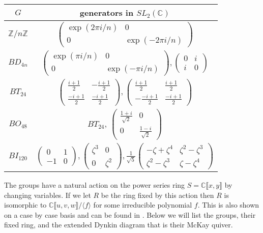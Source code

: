 \documentclass[11pt, a4paper, english]{article}
\theoremstyle{definition}
\newcommand{\C}{\mathbb{C}}
\begin{document}
\begin{center}
{\renewcommand{\arraystretch}{2}
\begin{tabular}{|c|c|}
\hline
$G$ & generators in $SL_2(\C)$
\\
\hline
\hline
$\mathbb{Z}/n\mathbb{Z}$ & $\begin{pmatrix}
\exp(2\pi i/n) & 0\\
0 & \exp(-2\pi i/n)
\end{pmatrix} $\\
\hline
$BD_{4n}$ &  $ \begin{pmatrix}
\exp(\pi i/n) & 0\\
0 & \exp(-\pi i/n)
\end{pmatrix}, \begin{pmatrix}
0 & i\\
i & 0
\end{pmatrix} $\\
\hline
$BT_{24}$ & $ \begin{pmatrix}
\frac{i+1}{2} & -\frac{i+1}{2}\\
\frac{-i+1}{2} & \frac{-i+1}{2}
\end{pmatrix}, \begin{pmatrix}
\frac{i+1}{2} & \frac{i+1}{2}\\
-\frac{-i+1}{2} & \frac{-i+1}{2}
\end{pmatrix} $\\
\hline
$BO_{48}$ & $BT_{24}$, $\begin{pmatrix}
\frac{1+i}{\sqrt{2}} & 0\\
0 & \frac{1-i}{\sqrt{2}}
\end{pmatrix}$\\
\hline
$BI_{120}$ & $ \begin{pmatrix}
0 & 1\\
-1 & 0
\end{pmatrix}, \begin{pmatrix}
\zeta^3 & 0\\
0 & \zeta^2
\end{pmatrix}, \frac{1}{\sqrt{5}}\begin{pmatrix}
-\zeta + \zeta^4 & \zeta^2 - \zeta^3\\
\zeta^2 - \zeta^3 & \zeta - \zeta^4
\end{pmatrix}$
\\
\hline
\end{tabular}
}
\end{center}

The groups have a natural action on the power series ring $S = \C\llbracket x, y \rrbracket$ by changing variables. If we let $R$ be the ring fixed by this action then $R$ is isomorphic to $\C\llbracket u, v, w \rrbracket / \langle f \rangle$ for some irreducible polynomial $f$. This is also shown on a case by case basis and can be found in \cite{kleinian}. Below we will list the groups, their fixed ring, and the extended Dynkin diagram that is their McKay quiver.
\end{document}
